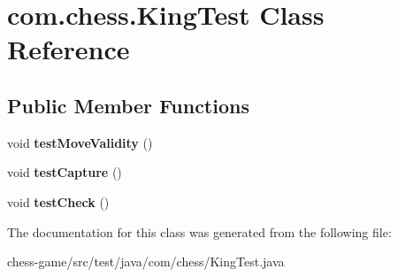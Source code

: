 \hypertarget{classcom_1_1chess_1_1_king_test}{}\section{com.\+chess.\+King\+Test Class Reference}
\label{classcom_1_1chess_1_1_king_test}
\subsection*{Public Member Functions}
\begin{DoxyCompactItemize}
\item 
\mbox{\label{classcom_1_1chess_1_1_king_test_ad492aa82ec860caf3c9f4738bb68e679}} 
void {\bfseries test\+Move\+Validity} ()
\item 
\mbox{\label{classcom_1_1chess_1_1_king_test_aeeffbcdb07d51f91fccea0d0510fa651}} 
void {\bfseries test\+Capture} ()
\item 
\mbox{\label{classcom_1_1chess_1_1_king_test_a89fdbb0ffe40c0eab81a4aa4d2c65d68}} 
void {\bfseries test\+Check} ()
\end{DoxyCompactItemize}


The documentation for this class was generated from the following file\+:\begin{DoxyCompactItemize}
\item 
chess-\/game/src/test/java/com/chess/King\+Test.\+java\end{DoxyCompactItemize}

